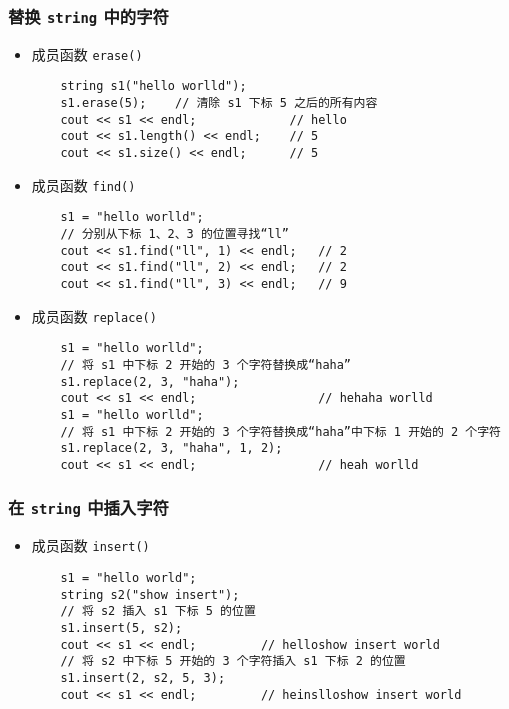 \documentclass[UTF8]{ctexart}
\begin{document}
\subsubsection{替换 \texttt{string} 中的字符}
\begin{itemize}
    \item 成员函数 \texttt{erase()}
    \begin{verbatim}
    string s1("hello worlld");
    s1.erase(5);    // 清除 s1 下标 5 之后的所有内容
    cout << s1 << endl;             // hello
    cout << s1.length() << endl;    // 5
    cout << s1.size() << endl;      // 5
    \end{verbatim}
    \item 成员函数 \texttt{find()}
    \begin{verbatim}
    s1 = "hello worlld";
    // 分别从下标 1、2、3 的位置寻找“ll”
    cout << s1.find("ll", 1) << endl;   // 2
    cout << s1.find("ll", 2) << endl;   // 2
    cout << s1.find("ll", 3) << endl;   // 9
    \end{verbatim}
    \item 成员函数 \texttt{replace()}
    \begin{verbatim}
    s1 = "hello worlld";
    // 将 s1 中下标 2 开始的 3 个字符替换成“haha”
    s1.replace(2, 3, "haha");
    cout << s1 << endl;                 // hehaha worlld
    s1 = "hello worlld";
    // 将 s1 中下标 2 开始的 3 个字符替换成“haha”中下标 1 开始的 2 个字符
    s1.replace(2, 3, "haha", 1, 2);
    cout << s1 << endl;                 // heah worlld
    \end{verbatim}
\end{itemize}

\subsubsection{在 \texttt{string} 中插入字符}
\begin{itemize}
    \item 成员函数 \texttt{insert()}
    \begin{verbatim}
    s1 = "hello world";
    string s2("show insert");
    // 将 s2 插入 s1 下标 5 的位置
    s1.insert(5, s2);
    cout << s1 << endl;         // helloshow insert world
    // 将 s2 中下标 5 开始的 3 个字符插入 s1 下标 2 的位置
    s1.insert(2, s2, 5, 3);
    cout << s1 << endl;         // heinslloshow insert world
    \end{verbatim}
\end{itemize}
\end{document}
